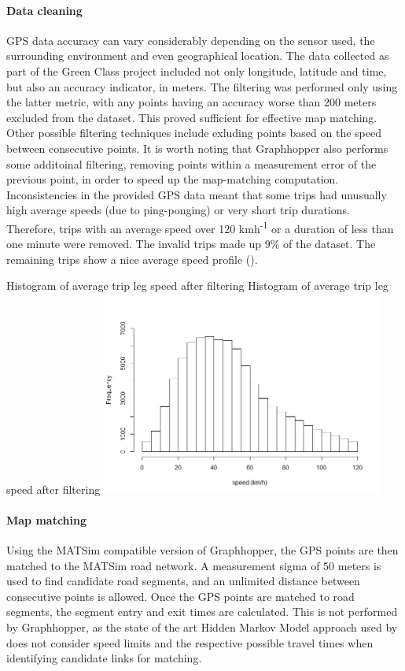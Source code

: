 \paragraph{Data cleaning}
GPS data accuracy can vary considerably depending on the sensor used, the surrounding environment and even geographical location. 
The data collected as part of the Green Class project included not only longitude, latitude and time, but also an accuracy indicator, in meters. 
The filtering was performed only using the latter metric, with any points having an accuracy worse than 200 meters excluded from the dataset. 
This proved sufficient for effective map matching.
Other possible filtering techniques include exluding points based on the speed between consecutive points. 
It is worth noting that Graphhopper also performs some additoinal filtering, removing points within a measurement error of the previous point, in order to speed up the map-matching computation.
Inconsistencies in the provided GPS data meant that some trips had unusually high average speeds (due to ping-ponging) or very short trip durations.
Therefore, trips with an average speed over 120 kmh\textsuperscript{-1} or a duration of less than one minute were removed.
The invalid trips made up 9\% of the dataset.
The remaining trips show a nice average speed profile ().

\createfigure%
	{Histogram of average trip leg speed after filtering}
	{Histogram of average trip leg speed after filtering}
    {\label{fig:avg_speeds}}
    {\includegraphics[width=0.7\textwidth]{figures/avg_speed_green_class_matched}}
	{}

\paragraph{Map matching}
Using the MATSim compatible version of Graphhopper, the GPS points are then matched to the MATSim road network.
A measurement sigma of 50 meters is used to find candidate road segments, and an unlimited distance between consecutive points is allowed.
Once the GPS points are matched to road segments, the segment entry and exit times are calculated. 
This is not performed by Graphhopper, as the state of the art Hidden Markov Model approach used by \citet{newson2009hidden} does not consider speed limits and the respective possible travel times when identifying candidate links for matching.

